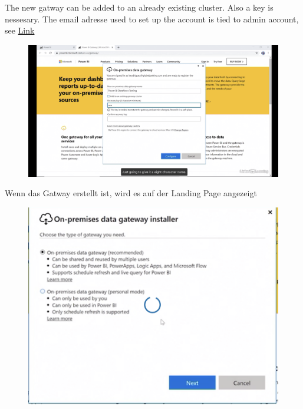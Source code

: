 The new gatway can be added to an already existing cluster. Also a key is nessesary. The email adresse used to set up the account is tied to admin account, see \href{https://community.powerbi.com/t5/Service/On-premises-data-gateway-email-address/m-p/902654#M84971}{Link} 
\begin{figure}[H]
	\centering
	\includegraphics[scale = 0.3]{attachment/chapter_1/Scc123}
\end{figure}

Wenn das Gatway erstellt ist, wird es auf der Landing Page angezeigt

\begin{figure}[H]
	\centering
	\includegraphics[scale = 0.3]{attachment/chapter_1/Scc125}
\end{figure}

